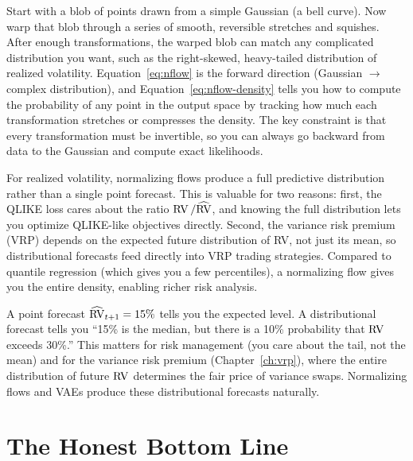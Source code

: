 \begin{intuition}
Start with a blob of points drawn from a simple Gaussian (a bell curve).
Now warp that blob through a series of smooth, reversible stretches and squishes.
After enough transformations, the warped blob can match any complicated distribution you want, such as the right-skewed, heavy-tailed distribution of realized volatility.
Equation~\eqref{eq:nflow} is the forward direction (Gaussian $\to$ complex distribution), and Equation~\eqref{eq:nflow-density} tells you how to compute the probability of any point in the output space by tracking how much each transformation stretches or compresses the density.
The key constraint is that every transformation must be invertible, so you can always go backward from data to the Gaussian and compute exact likelihoods.
\end{intuition}

\begin{projectconnection}
For realized volatility, normalizing flows produce a full predictive distribution rather than a single point forecast.
This is valuable for two reasons: first, the QLIKE loss cares about the ratio $\operatorname{RV} / \widehat{\operatorname{RV}}$, and knowing the full distribution lets you optimize QLIKE-like objectives directly.
Second, the variance risk premium (VRP) depends on the expected future distribution of RV, not just its mean, so distributional forecasts feed directly into VRP trading strategies.
Compared to quantile regression (which gives you a few percentiles), a normalizing flow gives you the entire density, enabling richer risk analysis.
\end{projectconnection}

\begin{keyidea}
A point forecast $\widehat{\operatorname{RV}}_{t+1} = 15\%$ tells you the expected level.
A distributional forecast tells you ``15\% is the median, but there is a 10\% probability that $\operatorname{RV}$ exceeds 30\%.''
This matters for risk management (you care about the tail, not the mean) and for the variance risk premium (Chapter~\ref{ch:vrp}), where the entire distribution of future $\operatorname{RV}$ determines the fair price of variance swaps.
Normalizing flows and VAEs produce these distributional forecasts naturally.
\end{keyidea}


\section{The Honest Bottom Line}\label{sec:dl:bottomline}

